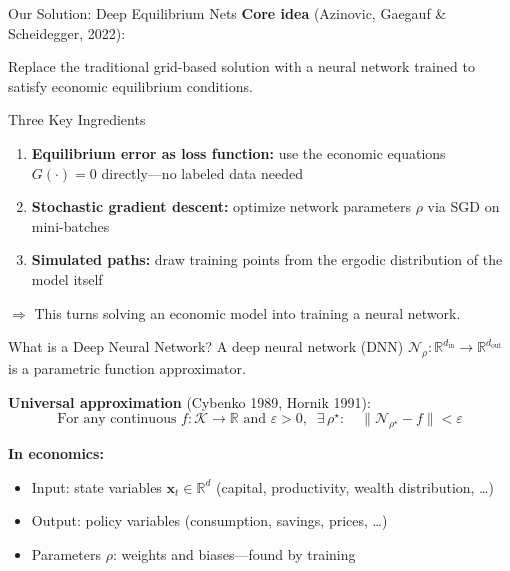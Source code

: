 \documentclass[aspectratio=169,11pt]{beamer}
\newcommand{\emphc}[1]{\textcolor{harvardcrimson}{#1}}
\newcommand{\x}{\bm{x}}
\newcommand{\R}{\mathbb{R}}
\begin{document}
\begin{frame}{Our Solution: Deep Equilibrium Nets}
\textbf{Core idea} (Azinovic, Gaegauf \& Scheidegger, 2022):

\vspace{0.3em}
Replace the traditional grid-based solution with a \emphc{neural network} trained to satisfy economic equilibrium conditions.

\vspace{0.5em}
\begin{block}{Three Key Ingredients}
\begin{enumerate}
    \item \textbf{Equilibrium error as loss function:} use the economic equations $G(\cdot) = 0$ directly---\emphc{no labeled data} needed
    \item \textbf{Stochastic gradient descent:} optimize network parameters $\rho$ via SGD on mini-batches
    \item \textbf{Simulated paths:} draw training points from the \emphc{ergodic distribution} of the model itself
\end{enumerate}
\end{block}

\vspace{0.3em}
{\small $\Rightarrow$ This turns \emphc{solving} an economic model into \emphc{training} a neural network.}
\end{frame}

\begin{frame}{What is a Deep Neural Network?}
A deep neural network (DNN) $\mathcal{N}_\rho : \R^{d_{\text{in}}} \to \R^{d_{\text{out}}}$ is a \emphc{parametric function approximator}.

\vspace{0.5em}
\textbf{Universal approximation} (Cybenko 1989, Hornik 1991):
\[
\text{For any continuous } f : \mathcal{K} \to \R \text{ and } \varepsilon > 0, \;\; \exists\, \rho^\star : \quad \|\mathcal{N}_{\rho^\star} - f\| < \varepsilon
\]

\vspace{0.5em}
\textbf{In economics:}
\begin{itemize}
    \item \emphc{Input:} state variables $\x_t \in \R^{d}$ (capital, productivity, wealth distribution, \ldots)
    \item \emphc{Output:} policy variables (consumption, savings, prices, \ldots)
    \item \emphc{Parameters} $\rho$: weights and biases---found by \emphc{training}
\end{itemize}
\end{frame}
\end{document}

